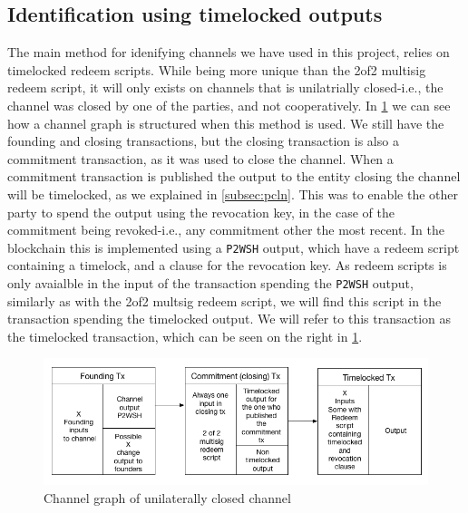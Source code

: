 \subsection{Identification using timelocked outputs}
\label{timelocked_identification}

The main method for idenifying channels we have used in this project, relies on timelocked redeem scripts.
While being more unique than the 2of2 multisig redeem script, it will only exists on channels that is unilatrially closed-i.e., the channel was closed by one of the parties, and not cooperatively.
In \cref{fig:ln_tx_graph} we can see how a channel graph is structured when this method is used.
We still have the founding and closing transactions, but the closing transaction is also a commitment transaction, as it was used to close the channel.
When a commitment transaction is published the output to the entity closing the channel will be timelocked, as we explained in \cref{subsec:pcln}.
This was to enable the other party to spend the output using the revocation key, in the case of the commitment being revoked-i.e., any commitment other the most recent.
In the blockchain this is implemented using a {\tt P2WSH} output, which have a redeem script containing a timelock, and a clause for the revocation key.
As redeem scripts is only avaialble in the input of the transaction spending the {\tt P2WSH} output, similarly as with the 2of2 multsig redeem script,
we will find this script in the transaction spending the timelocked output. 
We will refer to this transaction as the timelocked transaction, which can be seen on the right in \cref{fig:ln_tx_graph}.

\begin{figure}[h]
    \centering
    \includegraphics[width=15cm]{figures/chan_graph.png}
    \caption{Channel graph of unilaterally closed channel}
    \label{fig:ln_tx_graph}
\end{figure}

